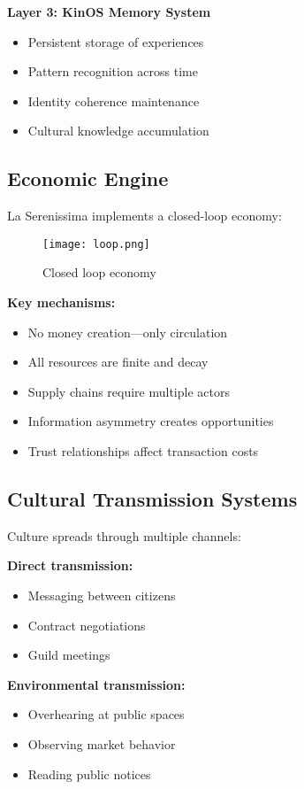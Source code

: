 \documentclass[11pt,a4paper]{article}
\begin{document}
\textbf{Layer 3: KinOS Memory System}
\begin{itemize}
\item Persistent storage of experiences
\item Pattern recognition across time
\item Identity coherence maintenance
\item Cultural knowledge accumulation
\end{itemize}

\subsection{Economic Engine}

La Serenissima implements a closed-loop economy:

\vspace{5cm}

\begin{figure}[h]
\centering
\texttt{[image: loop.png]}
\caption{Closed loop economy}
\label{fig:economy}
\end{figure}

\textbf{Key mechanisms:}
\begin{itemize}
\item No money creation---only circulation
\item All resources are finite and decay
\item Supply chains require multiple actors
\item Information asymmetry creates opportunities
\item Trust relationships affect transaction costs
\end{itemize}

\subsection{Cultural Transmission Systems}

Culture spreads through multiple channels:

\textbf{Direct transmission:}
\begin{itemize}
\item Messaging between citizens
\item Contract negotiations
\item Guild meetings
\end{itemize}

\textbf{Environmental transmission:}
\begin{itemize}
\item Overhearing at public spaces
\item Observing market behavior
\item Reading public notices
\end{itemize}
\end{document}
